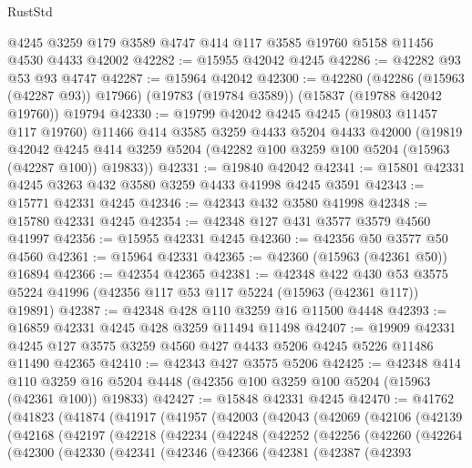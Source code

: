 \begin{lexlean}{RustStd}
\begin{coremodule}
    @4245
    @3259
    @179
    @3589
    @4747
    @414
    @117
    @3585
    @19760
    @5158
    @11456
    @4530
    @4433
    @42002
@42282 := @15955 @42042 @4245
@42286 := @42282 @93 @53 @93 @4747
@42287 := @15964 @42042
@42300 := @42280
    (@42286 (@15963 (@42287 @93)) @17966)
    (@19783 (@19784 @3589))
    (@15837 (@19788 @42042 @19760))
    @19794
@42330 := @19799
    @42042
    @4245
    @4245
    (@19803 @11457 @117 @19760)
    @11466
    @414
    @3585
    @3259
    @4433
    @5204
    @4433
    @42000
    (@19819
      @42042
      @4245
      @414
      @3259
      @5204
      (@42282 @100 @3259 @100 @5204 (@15963 (@42287 @100)) @19833))
@42331 := @19840 @42042
@42341 := @15801 @42331 @4245 @3263 @432 @3580 @3259 @4433 @41998 @4245 @3591
@42343 := @15771 @42331 @4245
@42346 := @42343 @432 @3580 @41998
@42348 := @15780 @42331 @4245
@42354 := @42348 @127 @431 @3577 @3579 @4560 @41997
@42356 := @15955 @42331 @4245
@42360 := @42356 @50 @3577 @50 @4560
@42361 := @15964 @42331
@42365 := @42360 (@15963 (@42361 @50)) @16894
@42366 := @42354 @42365
@42381 := @42348
    @422
    @430
    @53
    @3575
    @5224
    @41996
    (@42356 @117 @53 @117 @5224 (@15963 (@42361 @117)) @19891)
@42387 := @42348 @428 @110 @3259 @16 @11500 @4448
@42393 := @16859 @42331 @4245 @428 @3259 @11494 @11498
@42407 := @19909
    @42331
    @4245
    @127
    @3575
    @3259
    @4560
    @427
    @4433
    @5206
    @4245
    @5226
    @11486
    @11490
    @42365
@42410 := @42343 @427 @3575 @5206
@42425 := @42348
    @414
    @110
    @3259
    @16
    @5204
    @4448
    (@42356 @100 @3259 @100 @5204 (@15963 (@42361 @100)) @19833)
@42427 := @15848 @42331 @4245
@42470 := @41762
    (@41823
      (@41874
        (@41917
          (@41957
            (@42003
              (@42043
                (@42069
                  (@42106
                    (@42139
                      (@42168
                        (@42197
                          (@42218
                            (@42234
                              (@42248
                                (@42252
                                  (@42256
                                    (@42260
                                      (@42264
                                        (@42300
                                          (@42330
                                            (@42341
                                              (@42346
                                                (@42366
                                                  (@42381
                                                    (@42387
                                                      (@42393

\end{coremodule}
\end{lexlean}
